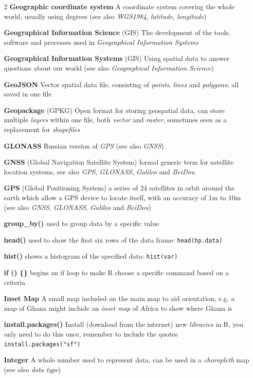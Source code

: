 \documentclass[a4paper,10pt]{article}
\begin{document}
\begin{multicols}{2}
\textbf{Geographic coordinate system} A coordinate system covering the whole world, usually using degrees (see also \textit{WGS1984}, \textit{latitude}, \textit{longitude})

\textbf{Geographical Information Science} (GIS) The development of the tools, software and processes used in \textit{Geographical Information Systems} 

\textbf{Geographical Information Systems} (GIS) Using spatial data to answer questions about our world (see also \textit{Geographical Information Science})

\textbf{GeoJSON} Vector spatial data file, consisting of \textit{points}, \textit{lines} and \textit{polygons}; all saved in one file

\textbf{Geopackage} (GPKG) Open format for storing geospatial data, can store multiple \textit{layers} within one file, both \textit{vector} and \textit{raster}, sometimes seen as a replacement for \textit{shapefiles}

\textbf{GLONASS} Russian version of \textit{GPS} (see also \textit{GNSS})

\textbf{GNSS} (Global Navigation Satellite System) formal generic term for satellite location systems, see also \textit{GPS}, \textit{GLONASS}, \textit{Galileo} and \textit{BeiDou}

\textbf{GPS} (Global Positioning System) a series of 24 satellites in orbit around the earth which allow a GPS device to locate itself, with an accuracy of 1m to 10m  (see also \textit{GNSS}, \textit{GLONASS}, \textit{Galileo} and \textit{BeiDou})

\textbf{group\_by()} used to group data by a specific value

\textbf{head()} used to show the first six rows of the data frame: \texttt{head(hp.data)}

\textbf{hist()} shows a histogram of the specified data: \texttt{hist(var)}

\textbf{if () \{\} } begins an if loop to make R choose a specific command based on a criteria

\textbf{Inset Map} A small map included on the main map to aid orientation, e.g. a map of Ghana might include an \textit{inset map} of Africa to show where Ghana is

\textbf{install.packages()} Install (download from the internet) new \textit{libraries} in R, you only need to do this once, remember to include the quotes \texttt{install.packages("sf")}

\textbf{Integer} A whole number used to represent data, can be used in a \textit{choropleth} map (see also \textit{data type}) 


\end{multicols}
\end{document}
